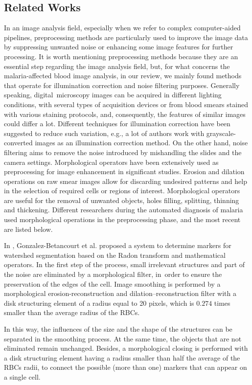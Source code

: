 \subsection{Related Works}
In an image analysis field, especially when we refer to complex computer-aided pipelines, preprocessing methods are particularly used to improve the image data by suppressing unwanted noise or enhancing some image features for further processing.
It is worth mentioning preprocessing methods because they are an essential step regarding the image analysis field, but, for what concerns the malaria-affected blood image analysis, in our review, we mainly found methods that operate for illumination correction and noise filtering purposes.
Generally speaking, digital~microscopy images can be acquired in different lighting conditions, with several types of acquisition devices or from blood smears stained with various staining protocols, and, consequently, the features of similar images could differ a lot.
Different techniques for illumination correction have been suggested to reduce such variation, e.g., a lot of authors work with grayscale-converted images as an illumination correction method.
On the other hand, noise filtering aims to remove the noise introduced by mishandling the slides and the camera settings.
Morphological operators have been extensively used as preprocessing for image enhancement in significant studies.
Erosion and dilation operations on raw smear images allow for discarding undesired patterns and help in the selection of required cells or regions of interest. Morphological operators are useful for the removal of unwanted
objects, holes filling, splitting, thinning and thickening. Different researchers during the automated diagnosis of malaria used morphological operations in the preprocessing phase, and the most recent are listed below.

In \cite{Gonzalez2016}, Gonzalez-Betancourt et al. proposed a system to determine markers for watershed segmentation based on the Radon transform and mathematical operators. In the first step of the process, small irrelevant structures and part of the noise are eliminated by a morphological filter, in~order to ensure the preservation of the edges of the cell. Image smoothing is performed by a morphological erosion-reconstruction and dilation--reconstruction filter with a disk structuring element of a radius equal to 20 pixels, which is $0.274$ times smaller than the average radius of the RBCs. 

In this way, the influences of the size and the shape of the structures can be separated in the smoothing process. At the same time, the objects that are not eliminated remain unchanged. Besides, a morphological closing is performed with a disk structuring element having a radius smaller than half the average of the RBCs radii, to connect the possible (more than one) markers that can appear on a single cell.

